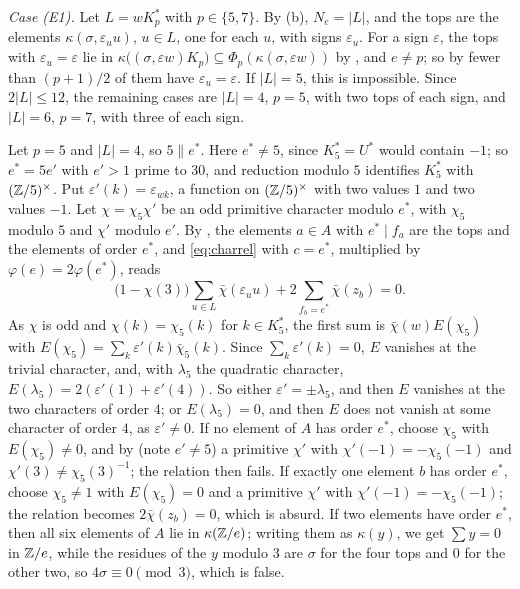 \emph{Case (E1).} Let $L=wK^{*}_{p}$ with $p\in\{5,7\}$. By
(b), $N_{e}=|L|$, and the tops are the elements
$\kappa(\sigma,\varepsilon_{u}u)$, $u\in L$, one for each $u$, with signs
$\varepsilon_{u}$. For a sign $\varepsilon$, the tops with
$\varepsilon_{u}=\varepsilon$ lie in $\kappa\bigl((\sigma,\varepsilon
w)K_{p}\bigr)\subseteq\Phi_{p}(\kappa(\sigma,\varepsilon w))$ by
, and $e\ne p$; so by  fewer than
$(p+1)/2$ of them have $\varepsilon_{u}=\varepsilon$. If $|L|=5$, this is
impossible. Since $2|L|\le12$, the remaining cases are $|L|=4$, $p=5$, with
two tops of each sign, and $|L|=6$, $p=7$, with three of each sign.

Let $p=5$ and $|L|=4$, so $5\parallel e^{*}$. Here $e^{*}\ne5$, since
$K^{*}_{5}=U^{*}$ would contain $-1$; so $e^{*}=5e'$ with $e'>1$ prime to
$30$, and reduction modulo $5$ identifies $K^{*}_{5}$ with
$(\mathbb{Z}/5)^{\times}$. Put $\varepsilon'(k)=\varepsilon_{wk}$, a function on
$(\mathbb{Z}/5)^{\times}$ with two values $1$ and two values $-1$. Let $\chi=\chi_{5}
\chi'$ be an odd primitive character modulo $e^{*}$, with $\chi_{5}$ modulo
$5$ and $\chi'$ modulo $e'$. By , the elements $a\in A$
with $e^{*}\mid f_{a}$ are the tops and the elements of order $e^{*}$, and
\eqref{eq:charrel} with $c=e^{*}$, multiplied by $\varphi(e)=2\varphi(e^{*})$,
reads
\[
  \bigl(1-\chi(3)\bigr)\sum_{u\in L}\bar\chi(\varepsilon_{u}u)
  +2\sum_{f_{b}=e^{*}}\bar\chi(z_{b})=0.
\]
As $\chi$ is odd and $\chi(k)=\chi_{5}(k)$ for $k\in K^{*}_{5}$, the first
sum is $\bar\chi(w)E(\chi_{5})$ with $E(\chi_{5})=\sum_{k}\varepsilon'(k)
\bar\chi_{5}(k)$. Since $\sum_{k}\varepsilon'(k)=0$, $E$ vanishes at the
trivial character, and, with $\lambda_{5}$ the quadratic character,
$E(\lambda_{5})=2(\varepsilon'(1)+\varepsilon'(4))$. So either
$\varepsilon'=\pm\lambda_{5}$, and then $E$ vanishes at the two characters of
order $4$; or $E(\lambda_{5})=0$, and then $E$ does not vanish at some
character of order $4$, as $\varepsilon'\ne0$. If no element of $A$ has order
$e^{*}$, choose $\chi_{5}$ with $E(\chi_{5})\ne0$, and by 
(note $e'\ne5$) a primitive $\chi'$ with $\chi'(-1)=-\chi_{5}(-1)$ and
$\chi'(3)\ne\chi_{5}(3)^{-1}$; the relation then fails. If exactly one
element $b$ has order $e^{*}$, choose $\chi_{5}\ne1$ with $E(\chi_{5})=0$ and
a primitive $\chi'$ with $\chi'(-1)=-\chi_{5}(-1)$; the relation becomes
$2\bar\chi(z_{b})=0$, which is absurd. If two elements have order $e^{*}$,
then all six elements of $A$ lie in $\kappa(\mathbb{Z}/e)$; writing them as
$\kappa(y)$, we get $\sum y=0$ in $\mathbb{Z}/e$, while the residues of the $y$
modulo $3$ are $\sigma$ for the four tops and $0$ for the other two, so
$4\sigma\equiv0\pmod3$, which is false.


